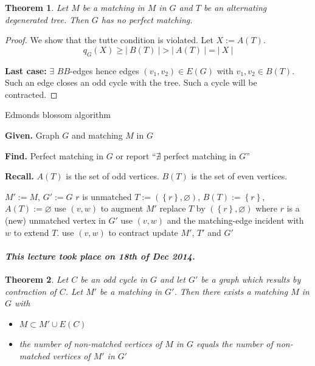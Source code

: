 \documentclass{article}
\newtheorem{theorem}{Theorem}
\newcommand{\card}[1]{\left|\:\!#1\:\!\right|}
\newcommand{\set}[1]{\left\{#1\right\}}
\newcommand{\given}[1]{\textbf{Given.} #1\par}
\newcommand{\find}[1]{\textbf{Find.} #1\par}
\newcommand{\dateref}[1]{\paragraph{\textit{This lecture took place on #1.}}}
\begin{document}
\begin{theorem}\label{proposition-6.7}
  Let $M$ be a matching in $M$ in $G$ and $T$ be an alternating degenerated tree.
  Then $G$ has no perfect matching.
\end{theorem}

\begin{proof}
  We show that the tutte condition is violated. Let $X := A(T)$.
  \[ q_G(X) \geq \card{B(T)} > \card{A(T)} = \card{X} \]

  \textbf{Last case:}
    $\exists$ $BB$-edges hence edges $(v_1, v_2) \in E(G)$ with $v_1, v_2 \in B(T)$.
    Such an edge closes an odd cycle with the tree. Such a cycle will be contracted.
\end{proof}

\begin{algorithm}
  \caption{Edmonds blossom algorithm}
  \label{edmonds-blossom-algo}
  \given{Graph $G$ and matching $M$ in $G$}
  \find{Perfect matching in $G$ or report ``$\nexists$ perfect matching in $G$''}
  \textbf{Recall.} $A(T)$ is the set of odd vertices. $B(T)$ is the set of even vertices. \par
\begin{algorithmic}[1]
  \State $M' := M$, $G' := G$
    \State {}
  \Else
    \State $r$ is unmatched
    \State $T := (\set{r}, \diameter)$, $B(T) := \set{r}$, $A(T) := \diameter$
  \EndIf
      \State use $(v, w)$ to augment $M'$
        \State {}
      \Else
        \State replace $T$ by $(\set{r}, \diameter)$ where $r$ is a (new) unmatched vertex in $G'$
      \EndIf
      \State use $(v, w)$ and the matching-edge incident with $w$ to extend $T$.
      \State use $(v, w)$ to contract
      \State update $M'$, $T'$ and $G'$
    \EndIf
  \EndWhile
  \State {}
\end{algorithmic}
\end{algorithm}

\dateref{18th of Dec 2014}

\begin{theorem}\label{proposition-6.8}
  Let $C$ be an odd cycle in $G$ and let $G'$ be a graph which results by contraction of $C$.
  Let $M'$ be a matching in $G'$. Then there exists a matching $M$ in $G$ with
  \begin{itemize}
    \item $M \subset M' \cup E(C)$
    \item the number of non-matched vertices of $M$ in $G$ equals the number of non-matched vertices of $M'$ in $G'$
  \end{itemize}
\end{theorem}
\end{document}
